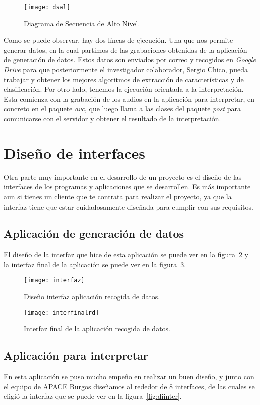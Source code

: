 \begin{figure}[H]
	\centering
	\texttt{[image: dsal]}
	\caption{Diagrama de Secuencia de Alto Nivel.}
	\label{fig:dsal}
\end{figure}

Como se puede observar, hay dos líneas de ejecución. Una que nos permite generar datos, en la cual partimos de las grabaciones obtenidas de la aplicación de generación de datos. Estos datos son enviados por correo y recogidos en \textit{Google Drive} para que posteriormente el investigador colaborador, Sergio Chico, pueda trabajar y obtener los mejores algoritmos de extracción de características y de clasificación. Por otro lado, tenemos la ejecución orientada a la interpretación. Esta comienza con la grabación de los audios en la aplicación para interpretar, en concreto en el paquete \textit{avc}, que luego llama a las clases del paquete \textit{post} para comunicarse con el servidor y obtener el resultado de la interpretación.
\section{Diseño de interfaces}
Otra parte muy importante en el desarrollo de un proyecto es el diseño de las interfaces de los programas y aplicaciones que se desarrollen. Es más importante aun si tienes un cliente que te contrata para realizar el proyecto, ya que la interfaz tiene que estar cuidadosamente diseñada para cumplir con sus requisitos.
\subsection{Aplicación de generación de datos}
El diseño de la interfaz que hice de esta aplicación se puede ver en la figura~\ref{fig:digd} y la interfaz final de la aplicación se puede ver en la figura~\ref{fig:digdfinal}.
\begin{figure}
	\centering
	\texttt{[image: interfaz]}
	\caption{Diseño interfaz aplicación recogida de datos.}
	\label{fig:digd}
\end{figure}

\begin{figure}
	\centering
	\texttt{[image: interfinalrd]}
	\caption{Interfaz final de la aplicación recogida de datos.}
	\label{fig:digdfinal}
\end{figure}

\subsection{Aplicación para interpretar}
En esta aplicación se puso mucho empeño en realizar un buen diseño, y junto con el equipo de APACE Burgos diseñamos al rededor de 8 interfaces, de las cuales se eligió la interfaz que se puede ver en la figura~\ref{fig:diinter}.

